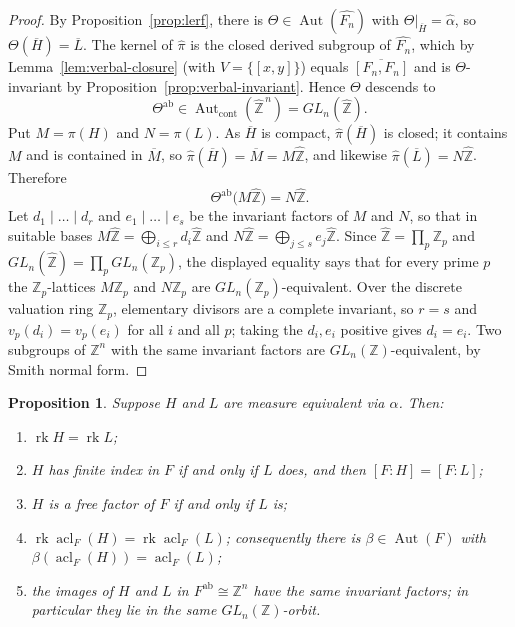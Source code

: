 \documentclass[11pt]{amsart}
\theoremstyle{plain}
\newtheorem{proposition}[theorem]{Proposition}
\theoremstyle{definition}
\newcommand{\acl}{\operatorname{acl}}
\newcommand{\rk}{\operatorname{rk}}
\newcommand{\Aut}{\operatorname{Aut}}
\newcommand{\Zhat}{\widehat{\mathbb{Z}}}
\begin{document}
\begin{proof}
By Proposition~\ref{prop:lerf}, there is $\Theta\in\Aut(\widehat{F_n})$ with
$\Theta|_{\overline H}=\widehat\alpha$, so $\Theta(\overline H)=\overline L$.
The kernel of $\widehat\pi$ is the closed derived subgroup of $\widehat{F_n}$,
which by Lemma~\ref{lem:verbal-closure} (with $V=\{[x,y]\}$) equals
$\overline{[F_n,F_n]}$ and is $\Theta$-invariant by
Proposition~\ref{prop:verbal-invariant}.  Hence $\Theta$ descends to
\[
  \Theta^{\mathrm{ab}}\in\Aut_{\mathrm{cont}}(\Zhat^{\,n})=GL_n(\Zhat).
\]
Put $M=\pi(H)$ and $N=\pi(L)$.  As $\overline H$ is compact,
$\widehat\pi(\overline H)$ is closed; it contains $M$ and is contained in
$\overline M$, so $\widehat\pi(\overline H)=\overline M=M\Zhat$, and likewise
$\widehat\pi(\overline L)=N\Zhat$.  Therefore
\[
  \Theta^{\mathrm{ab}}\bigl(M\Zhat\bigr)=N\Zhat .
\]
Let $d_1\mid\dots\mid d_r$ and $e_1\mid\dots\mid e_s$ be the invariant factors of
$M$ and $N$, so that in suitable bases $M\Zhat=\bigoplus_{i\le r}d_i\Zhat$ and
$N\Zhat=\bigoplus_{j\le s}e_j\Zhat$.  Since $\Zhat=\prod_p\mathbb Z_p$ and
$GL_n(\Zhat)=\prod_pGL_n(\mathbb Z_p)$, the displayed equality says that for
every prime $p$ the $\mathbb Z_p$-lattices $M\mathbb Z_p$ and $N\mathbb Z_p$ are
$GL_n(\mathbb Z_p)$-equivalent.  Over the discrete valuation ring $\mathbb Z_p$,
elementary divisors are a complete invariant, so $r=s$ and $v_p(d_i)=v_p(e_i)$
for all $i$ and all $p$; taking the $d_i,e_i$ positive gives $d_i=e_i$.  Two
subgroups of $\mathbb Z^{n}$ with the same invariant factors are
$GL_n(\mathbb Z)$-equivalent, by Smith normal form.
\end{proof}

\begin{proposition}\label{prop:invariants}
Suppose $H$ and $L$ are measure equivalent via $\alpha$.  Then:
\begin{enumerate}
\item[(i)]   $\rk H=\rk L$;
\item[(ii)]  $H$ has finite index in $F$ if and only if $L$ does, and then
             $[F:H]=[F:L]$;
\item[(iii)] $H$ is a free factor of $F$ if and only if $L$ is;
\item[(iv)]  $\rk\acl_F(H)=\rk\acl_F(L)$; consequently there is
             $\beta\in\Aut(F)$ with $\beta(\acl_F(H))=\acl_F(L)$;
\item[(v)]   the images of $H$ and $L$ in $F^{\mathrm{ab}}\cong\mathbb Z^{n}$
             have the same invariant factors; in particular they lie in the same
             $GL_n(\mathbb Z)$-orbit.
\end{enumerate}
\end{proposition}
\end{document}
